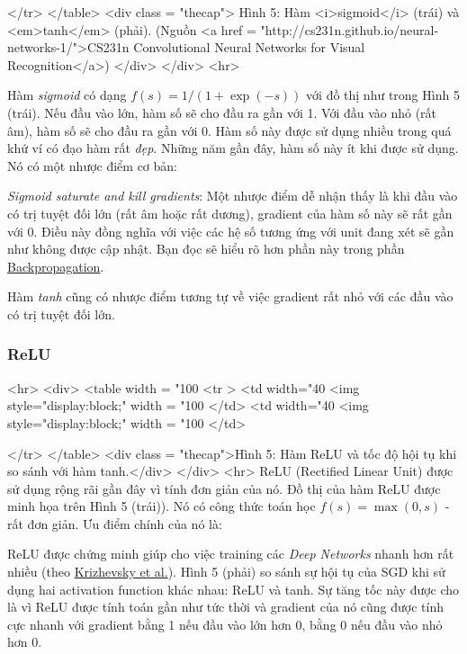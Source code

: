     </tr> 
</table> 
<div class = "thecap"> Hình 5: Hàm <i>sigmoid</i> (trái) và <em>tanh</em> (phải). (Nguồn <a href = "http://cs231n.github.io/neural-networks-1/">CS231n Convolutional Neural Networks for Visual Recognition</a>) 
</div> 
</div> 
<hr> 
 
Hàm \textit{sigmoid} có dạng $f(s) = 1/(1 + \exp(-s))$ với đồ thị như trong Hình 5 (trái). Nếu đầu vào lớn, hàm số sẽ cho đầu ra gần với 1. Với đầu vào nhỏ (rất âm), hàm số sẽ cho đầu ra gần với 0. Hàm số này được sử dụng nhiều trong quá khứ ví có đạo hàm rất \textit{đẹp}. Những năm gần đây, hàm số này ít khi được sử dụng. Nó có một nhược điểm cơ bản: 
 
\item \textit{Sigmoid saturate and kill gradients}: Một nhược điểm dễ nhận thấy là khi đầu vào có trị tuyệt đối lớn (rất âm hoặc rất dương), gradient của hàm số này sẽ rất gần với 0. Điều này đồng nghĩa với việc các hệ số tương ứng với unit đang xét sẽ gần như không được cập nhật. Bạn đọc sẽ hiểu rõ hơn phần này trong phần \href{http://machinelearningcoban.com#-backpropagation}{Backpropagation}. 
 
Hàm \textit{tanh} cũng có nhược điểm tương tự về việc gradient rất nhỏ với các đầu vào có trị tuyệt đối lớn. 
 
 
\subsubsection{ReLU}
 
<hr> 
<div> 
<table width = "100%
   <tr > 
        <td width="40%
        <img style="display:block;" width = "100%
         </td> 
        <td width="40%
        <img style="display:block;" width = "100%
        </td> 
 
    </tr> 
</table> 
 <div class = "thecap">Hình 5: Hàm ReLU và tốc độ hội tụ khi so sánh với hàm tanh.</div> 
</div> 
<hr> 
ReLU (Rectified Linear Unit) được sử dụng rộng rãi gần đây vì tính đơn giản của nó. Đồ thị của hàm ReLU được minh họa trên Hình 5 (trái)). Nó có công thức toán học $f(s) = \max(0, s)$ - rất đơn giản. Ưu điểm chính của nó là: 
 
\item ReLU được chứng minh giúp cho việc training các \textit{Deep Networks} nhanh hơn rất nhiều (theo \href{http://www.cs.toronto.edu/~fritz/absps/imagenet.pdf}{Krizhevsky et al.}). Hình 5 (phải) so sánh sự hội tụ của SGD khi sử dụng hai activation function khác nhau: ReLU và tanh. Sự tăng tốc này được cho là vì ReLU được tính toán gần như tức thời và gradient của nó cũng được tính cực nhanh với gradient bằng 1 nếu đầu vào lớn hơn 0, bằng 0 nếu đầu vào nhỏ hơn 0. 
 
